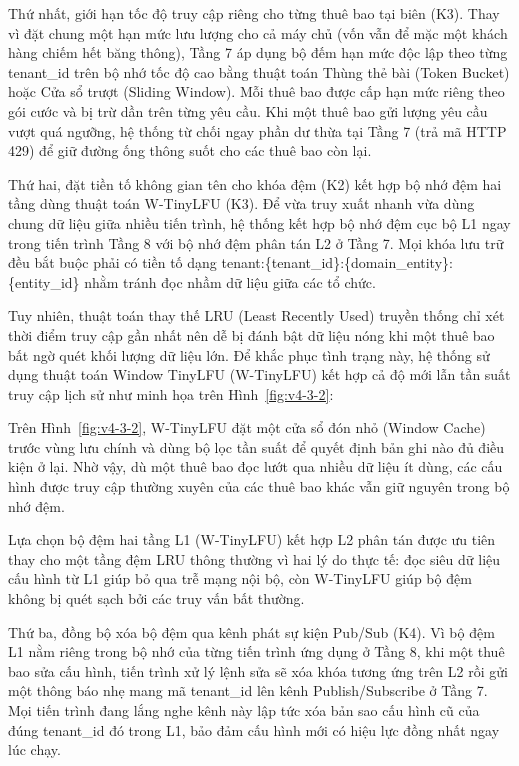 Thứ nhất, giới hạn tốc độ truy cập riêng cho từng thuê bao tại biên (K3). Thay vì đặt chung một hạn mức lưu lượng cho cả máy chủ (vốn vẫn để mặc một khách hàng chiếm hết băng thông), Tầng 7 áp dụng bộ đếm hạn mức độc lập theo từng tenant\_\allowbreak{}id trên bộ nhớ tốc độ cao bằng thuật toán Thùng thẻ bài (Token Bucket) hoặc Cửa sổ trượt (Sliding Window). Mỗi thuê bao được cấp hạn mức riêng theo gói cước và bị trừ dần trên từng yêu cầu. Khi một thuê bao gửi lượng yêu cầu vượt quá ngưỡng, hệ thống từ chối ngay phần dư thừa tại Tầng 7 (trả mã HTTP 429) để giữ đường ống thông suốt cho các thuê bao còn lại.

Thứ hai, đặt tiền tố không gian tên cho khóa đệm (K2) kết hợp bộ nhớ đệm hai tầng dùng thuật toán W-TinyLFU (K3). Để vừa truy xuất nhanh vừa dùng chung dữ liệu giữa nhiều tiến trình, hệ thống kết hợp bộ nhớ đệm cục bộ L1 ngay trong tiến trình Tầng 8 với bộ nhớ đệm phân tán L2 ở Tầng 7. Mọi khóa lưu trữ đều bắt buộc phải có tiền tố dạng tenant:\{tenant\_\allowbreak{}id\}:\{domain\_\allowbreak{}entity\}:\{entity\_\allowbreak{}id\} nhằm tránh đọc nhầm dữ liệu giữa các tổ chức.

Tuy nhiên, thuật toán thay thế LRU (Least Recently Used) truyền thống chỉ xét thời điểm truy cập gần nhất nên dễ bị đánh bật dữ liệu nóng khi một thuê bao bất ngờ quét khối lượng dữ liệu lớn. Để khắc phục tình trạng này, hệ thống sử dụng thuật toán Window TinyLFU (W-TinyLFU) \cite{v4-20} kết hợp cả độ mới lẫn tần suất truy cập lịch sử như minh họa trên Hình~\ref{fig:v4-3-2}:


Trên Hình~\ref{fig:v4-3-2}, W-TinyLFU đặt một cửa sổ đón nhỏ (Window Cache) trước vùng lưu chính và dùng bộ lọc tần suất để quyết định bản ghi nào đủ điều kiện ở lại. Nhờ vậy, dù một thuê bao đọc lướt qua nhiều dữ liệu ít dùng, các cấu hình được truy cập thường xuyên của các thuê bao khác vẫn giữ nguyên trong bộ nhớ đệm.

Lựa chọn bộ đệm hai tầng L1 (W-TinyLFU) kết hợp L2 phân tán được ưu tiên thay cho một tầng đệm LRU thông thường vì hai lý do thực tế: đọc siêu dữ liệu cấu hình từ L1 giúp bỏ qua trễ mạng nội bộ, còn W-TinyLFU giúp bộ đệm không bị quét sạch bởi các truy vấn bất thường.

Thứ ba, đồng bộ xóa bộ đệm qua kênh phát sự kiện Pub/Sub (K4). Vì bộ đệm L1 nằm riêng trong bộ nhớ của từng tiến trình ứng dụng ở Tầng 8, khi một thuê bao sửa cấu hình, tiến trình xử lý lệnh sửa sẽ xóa khóa tương ứng trên L2 rồi gửi một thông báo nhẹ mang mã tenant\_\allowbreak{}id lên kênh Publish/Subscribe ở Tầng 7. Mọi tiến trình đang lắng nghe kênh này lập tức xóa bản sao cấu hình cũ của đúng tenant\_\allowbreak{}id đó trong L1, bảo đảm cấu hình mới có hiệu lực đồng nhất ngay lúc chạy.

